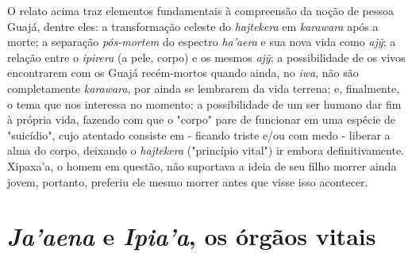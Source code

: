 O relato acima traz elementos fundamentais à compreensão da noção de
pessoa Guajá, dentre eles: a transformação celeste do \emph{hajtekera}
em \emph{karawara} após a morte; a separação \emph{pós-mortem} do
espectro \emph{ha'aera} e sua nova vida como \emph{ajỹ}; a relação entre
o \emph{ipirera} (a pele, corpo) e os mesmos \emph{ajỹ}; a possibilidade
de os vivos encontrarem com os Guajá recém-mortos quando ainda, no
\emph{iwa}, não são completamente \emph{karawara}, por ainda se
lembrarem da vida terrena; e, finalmente, o tema que nos interessa no
momento: a possibilidade de um ser humano dar fim à própria vida,
fazendo com que o "corpo" pare de funcionar em uma espécie de
"suicídio", cujo atentado consiste em - ficando triste e/ou com medo -
liberar a alma do corpo, deixando o \emph{hajtekera} ("princípio vital")
ir embora definitivamente. Xipaxa'a, o homem em questão, não suportava a
ideia de seu filho morrer ainda jovem, portanto, preferiu ele mesmo
morrer antes que visse isso acontecer.

\section{\emph{Ja'aena} e \emph{Ipia'a}, os órgãos
vitais}\label{jaaena-e-ipiaa-os-uxf3rguxe3os-vitais}

